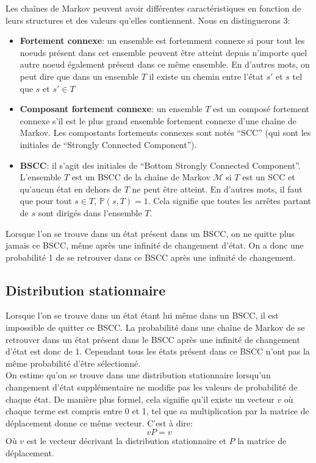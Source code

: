 \documentclass[letterpaper]{article}
\begin{document}
    Les chaînes de Markov peuvent avoir différentes caractéristiques en fonction 
    de leurs structures et des valeurs qu'elles contiennent.  
    Nous en distinguerons 3:
    \begin{itemize}
     \item \textbf{Fortement connexe}: un ensemble est fortemment connexe si pour tout
      les noeuds présent dans cet ensemble peuvent être atteint depuis n'importe quel
      autre noeud également présent dans ce même ensemble.  En d'autres mots, on peut dire 
      que dans un ensemble $T$ il existe un chemin entre l'état $s'$ et $s$ tel que 
      $s$ et $s' \in T$
     \item \textbf{Composant fortement connexe}: un ensemble $T$ est un composé fortement
      connexe s'il est le plus grand ensemble fortement connexe d'une chaîne de Markov.  
      Les compostants fortements connexes sont notés ``SCC'' (qui sont les initiales de
      ``Strongly Connected Component'').
     \item \textbf{BSCC}: il s'agit des initiales de ``Bottom Strongly Connected Component''.
      L'ensemble $T$ est un BSCC de la chaîne de Markov $\mathcal{M}$ si $T$ est un SCC et
      qu'aucun état en dehors de $T$ ne peut être atteint.  En d'autres mots, il faut que
      pour tout $s \in T$, $\mathbb{P}(s, T) = 1$.  Cela signifie que toutes les 
      arrêtes partant de $s$ sont dirigés dans l'ensemble $T$.
    \end{itemize}
    Lorsque l'on se trouve dans un état présent dans un BSCC, on ne quitte plus jamais ce
    BSCC, même après une infinité de changement d'état.  On a donc une probabilité 1 de 
    se retrouver dans ce BSCC après une infinité de changement.
  
  \subsection{Distribution stationnaire}
    Lorsque l'on se trouve dans un état étant lui même dans un BSCC, il est impossible de 
    quitter ce BSCC.  La probabilité dans une chaîne de Markov de se retrouver dans un état
    présent dans le BSCC après une infinité de changement d'état est donc de 1.  Cependant
    tous les états présent dans ce BSCC n'ont pas la même probabilité d'être sélectionné.\\
    On estime qu'on se trouve dans une distribution stationnaire lorsqu'un changement d'état
    supplémentaire ne modifie pas les valeurs de probabilité de chaque état.  De manière plus 
    formel, cela signifie qu'il existe un vecteur $v$ où chaque terme est compris entre 0 et 1,
    tel que sa multiplication par la matrice de déplacement donne ce même vecteur.  C'est à dire:
    $$v P = v$$
    Où $v$ est le vecteur décrivant la distribution stationnaire et $P$ la matrice de déplacement.
    
\end{document}

